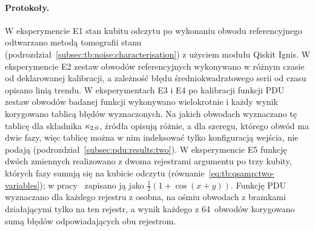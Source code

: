 \paragraph{Protokoły.}
W eksperymencie E1 stan kubitu odczytu po wykonaniu obwodu referencyjnego odtwarzano metodą tomografii stanu (podrozdział~\ref{subsec:tb:noise:characterisation}) z użyciem modułu Qiskit Ignis.
W eksperymencie E2 zestaw obwodów referencyjnych wykonywano w różnym czasie od deklarowanej kalibracji, a zależność błędu średniokwadratowego serii od czasu opisano linią trendu.
W eksperymentach E3 i E4 po kalibracji funkcji PDU zestaw obwodów badanej funkcji wykonywano wielokrotnie i każdy wynik korygowano tablicą błędów wyznaczonych.
Na jakich obwodach wyznaczano tę tablicę dla składnika $\kappa_{2,0}$, źródła opisują różnie, a dla szeregu, którego obwód ma dwie fazy, więc tablicę można w nim indeksować tylko konfiguracją wejścia, nie podają (podrozdział~\ref{subsec:pdu:results:two}).
W eksperymencie E5 funkcję dwóch zmiennych realizowano z dwoma rejestrami argumentu po trzy kubity, których fazy sumują się na kubicie odczytu (równanie~\eqref{eq:tb:qsamp:two-variables}); w pracy~\cite{werner_magisterka_2022} zapisano ją jako $\tfrac{1}{2}(1+\cos(x+y))$.
Funkcję PDU wyznaczano dla każdego rejestru z osobna, na ośmiu obwodach z bramkami działającymi tylko na ten rejestr, a wynik każdego z 64~obwodów korygowano sumą błędów odpowiadających obu rejestrom.


